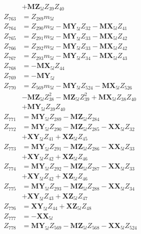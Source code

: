 \begin{multicols}{2}
\begin{align}
&+ \mathbf{MZ}_{5l}Z_{39}Z_{40} \nonumber \\
Z_{763} &= Z_{289}m_{5l} \nonumber \\
Z_{764} &= Z_{290}m_{5l} - \mathbf{MY}_{5l}Z_{32} - \mathbf{MX}_{5l}Z_{41} \nonumber \\
Z_{765} &= Z_{291}m_{5l} - \mathbf{MY}_{5l}Z_{33} - \mathbf{MX}_{5l}Z_{42} \nonumber \\
Z_{766} &= Z_{292}m_{5l} - \mathbf{MY}_{5l}Z_{33} - \mathbf{MX}_{5l}Z_{42} \nonumber \\
Z_{767} &= Z_{293}m_{5l} - \mathbf{MY}_{5l}Z_{34} - \mathbf{MX}_{5l}Z_{43} \nonumber \\
Z_{768} &= -\mathbf{MX}_{5l}Z_{44} \nonumber \\
Z_{769} &= -\mathbf{MY}_{5l} \nonumber \\
Z_{770} &= Z_{569}m_{5l} - \mathbf{MY}_{5l}Z_{524} - \mathbf{MX}_{5l}Z_{526}  \nonumber \\
&- \mathbf{MZ}_{5l}Z_{38}^2 - \mathbf{MZ}_{5l}Z_{39}^2 + \mathbf{MX}_{5l}Z_{38}Z_{40}  \nonumber \\
&+ \mathbf{MY}_{5l}Z_{39}Z_{40} \nonumber \\
Z_{771} &= \mathbf{MY}_{5l}Z_{289} - \mathbf{MZ}_{5l}Z_{284} \nonumber \\
Z_{772} &= \mathbf{MY}_{5l}Z_{290} - \mathbf{MZ}_{5l}Z_{285} - \mathbf{XX}_{5l}Z_{32}  \nonumber \\
&+ \mathbf{XY}_{5l}Z_{41} + \mathbf{XZ}_{5l}Z_{45} \nonumber \\
Z_{773} &= \mathbf{MY}_{5l}Z_{291} - \mathbf{MZ}_{5l}Z_{286} - \mathbf{XX}_{5l}Z_{33}  \nonumber \\
&+ \mathbf{XY}_{5l}Z_{42} + \mathbf{XZ}_{5l}Z_{46} \nonumber \\
Z_{774} &= \mathbf{MY}_{5l}Z_{292} - \mathbf{MZ}_{5l}Z_{287} - \mathbf{XX}_{5l}Z_{33}  \nonumber \\
&+ \mathbf{XY}_{5l}Z_{42} + \mathbf{XZ}_{5l}Z_{46} \nonumber \\
Z_{775} &= \mathbf{MY}_{5l}Z_{293} - \mathbf{MZ}_{5l}Z_{288} - \mathbf{XX}_{5l}Z_{34}  \nonumber \\
&+ \mathbf{XY}_{5l}Z_{43} + \mathbf{XZ}_{5l}Z_{47} \nonumber \\
Z_{776} &= \mathbf{XY}_{5l}Z_{44} + \mathbf{XZ}_{5l}Z_{48} \nonumber \\
Z_{777} &= -\mathbf{XX}_{5l} \nonumber \\
Z_{778} &= \mathbf{MY}_{5l}Z_{569} - \mathbf{MZ}_{5l}Z_{568} - \mathbf{XX}_{5l}Z_{524}  \nonumber \\

\end{align}
\end{multicols}
